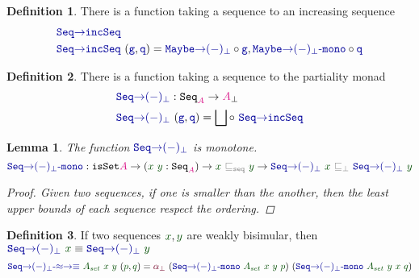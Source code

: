 \documentclass[twoside,11pt,openright]{report}
\theoremstyle{plain} %
\newtheorem{lem}[thm]{Lemma}
\theoremstyle{definition}
\newtheorem{defn}{Definition}[section]
\theoremstyle{remark}
\newcommand*{\term}[1]{\textcolor{green!30!black}{#1}} %
\newcommand*{\type}[1]{\textcolor{magenta!90!black}{#1}}
\newcommand*{\relation}[1]{\textcolor{gray}{\ensuremath{\mathtt{#1}}}}
\newcommand*{\function}[1]{\textcolor{blue!60!black}{\ensuremath{\mathtt{#1}}}}
\newcommand*{\constructor}[1]{\textcolor{purple!60!black}{\ensuremath{\mathtt{#1}}}}
\newcommand*{\typeformer}[1]{\ensuremath{\mathtt{#1}}}
\begin{document}
\begin{defn}
  There is a function taking a sequence to an increasing sequence 
  \begin{equation}
    \begin{aligned}
      &\function{Seq{\rightarrow}incSeq} \\
      &\function{Seq{\rightarrow}incSeq}~(\function{g} , \function{q}) = \function{Maybe{\rightarrow}(-)_\bot} \circ \function{g} , \function{Maybe{\rightarrow}(-)_\bot\text{-}mono} \circ \function{q}
    \end{aligned}
  \end{equation}
\end{defn}
\begin{defn}
  There is a function taking a sequence to the partiality monad
  \begin{equation}
    \begin{aligned}
      &\function{Seq{\rightarrow}(-)_\bot} : \typeformer{Seq}_{\type{A}} \rightarrow \type{A}_{\bot} \\
      &\function{Seq{\rightarrow}(-)_\bot}~(\function{g},\function{q}) = \bigsqcup \circ~\function{Seq{\rightarrow}incSeq}
    \end{aligned}
  \end{equation}
\end{defn}
\begin{lem}
  The function \(\function{Seq{\rightarrow}(-)_\bot}\) is monotone. 
  \begin{equation}
    \function{Seq{\rightarrow}(-)_\bot\text{-}mono} : \typeformer{isSet} \type{A} \rightarrow (\term{x}~\term{y} : \typeformer{Seq}_{\type{A}}) \rightarrow \term{x}~\relation{\sqsubseteq_{seq}}~\term{y} \rightarrow \function{Seq{\rightarrow}(-)_\bot}~\term{x}~\relation{\sqsubseteq_{\bot}}~\function{Seq{\rightarrow}(-)_\bot}~\term{y}
\end{equation}
  \begin{proof}
    Given two sequences, if one is smaller than the another, then the least upper bounds of each sequence respect the ordering. 
  \end{proof}
\end{lem}
\begin{defn}
  If two sequences \(\term{x},\term{y}\) are weakly bisimular, then \(\function{Seq{\rightarrow}(-)_\bot}~\term{x} \equiv \function{Seq{\rightarrow}(-)_\bot}~\term{y}\)
\begin{equation}
  \function{Seq{\rightarrow}(-)_\bot\text{-}{\approx}{\rightarrow}{\equiv}}~\term{A_{set}}~\term{x}~\term{y}~(\term{p} , \term{q}) = \constructor{\alpha_{\bot}}~(\function{Seq{\rightarrow}(-)_\bot\text{-}mono}~\term{A_{set}}~\term{x}~\term{y}~\term{p})~(\function{Seq{\rightarrow}(-)_\bot\text{-}mono}~\term{A_{set}}~\term{y}~\term{x}~\term{q})
\end{equation}
\end{defn}
\end{document}
